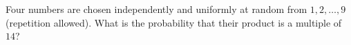 Four numbers are chosen independently and uniformly at random from $1,2,\dots,9$ (repetition allowed). What is the probability that their product is a multiple of $14$?
